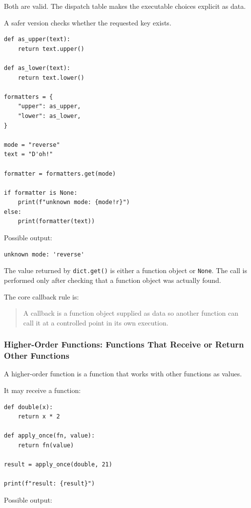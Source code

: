 Both are valid. The dispatch table makes the executable choices explicit as data.

A safer version checks whether the requested key exists.

\begin{verbatim}
def as_upper(text):
    return text.upper()

def as_lower(text):
    return text.lower()

formatters = {
    "upper": as_upper,
    "lower": as_lower,
}

mode = "reverse"
text = "D'oh!"

formatter = formatters.get(mode)

if formatter is None:
    print(f"unknown mode: {mode!r}")
else:
    print(formatter(text))
\end{verbatim}

Possible output:

\begin{verbatim}
unknown mode: 'reverse'
\end{verbatim}

The value returned by \texttt{dict.get()} is either a function object or \texttt{None}. The call is performed only after checking that a function object was actually found.

The core callback rule is:

\begin{quote}
A callback is a function object supplied as data so another function can call it at a controlled point in its own execution.
\end{quote}

\subsubsection{Higher-Order Functions: Functions That Receive or Return Other Functions}

A higher-order function is a function that works with other functions as values.

It may receive a function:

\begin{verbatim}
def double(x):
    return x * 2

def apply_once(fn, value):
    return fn(value)

result = apply_once(double, 21)

print(f"result: {result}")
\end{verbatim}

Possible output:

